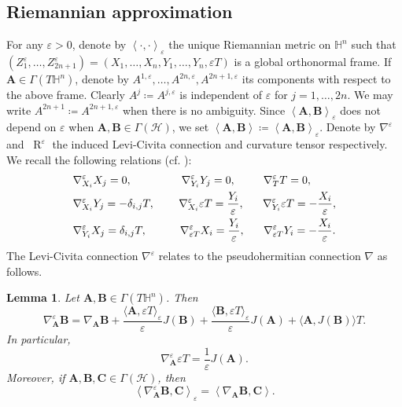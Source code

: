 \documentclass[11pt]{amsart}
\newcommand{\hhh}{{\mathcal{H}}}
\newcommand{\A}{\mathbf{A}}
\newcommand{\B}{\mathbf{B}}
\newcommand{\C}{\mathbf{C}}
\newcommand{\hh}{{\mathbb{H}}}
\newcommand{\eps}{\varepsilon}
\DeclareMathOperator{\R}{R}
\newtheorem{lemma}[theorem]{Lemma}
\theoremstyle{definition}
\theoremstyle{remark}
\numberwithin{equation}{section}
\begin{document}
   \subsection{Riemannian approximation}
   For any $\eps>0$, denote by $\left\langle\cdot,\cdot\right\rangle_\eps$ the unique Riemannian metric on $\hh^n$ such that $(Z_1^\eps,\ldots,Z_{2n+1}^\eps)=(X_1,\ldots,X_n,Y_1,\ldots,Y_n,\eps T)$ is a global orthonormal frame. If $\A\in\Gamma(T\hh^n)$, denote by $A^{1,\eps},\ldots,A^{2n,\eps},A^{2n+1,\eps}$ its components with respect to the above frame. Clearly $A^j\coloneqq A^{j,\eps}$ is independent of $\eps$ for $j=1,\ldots,2n$. We may write $A^{2n+1}\coloneqq A^{2n+1,\eps}$ when there is no ambiguity.
   Since $\left\langle\A,\B\right\rangle_\eps$ does not depend on $\eps$ when $\A,\B\in\Gamma(\hhh)$, we set $\left\langle\A,\B\right\rangle\coloneqq \left\langle\A,\B\right\rangle_\eps.$    Denote by $\nabla^\eps$ and $\ \R^\eps $ the induced Levi-Civita connection and curvature tensor respectively. We recall the following relations (cf. \cite{MR5029815}):
   \begin{alignat}{2}
&\notag \nabla_{X_i}^\eps X_j=0, \qquad \qquad  \ \, \nabla^\eps_{Y_i}Y_j=0, \qquad \ \,\nabla^\eps_{T}T=0, \\
\label{levi_civita}&\nabla^\eps_{X_i}Y_j=-\delta_{i,j}T, \qquad \, \nabla^\eps_{X_i}\eps T=\frac{Y_i}{\eps}, \quad \ \ \nabla^\eps_{Y_i}\eps T=-\frac{X_i}{\eps}, \\
&\notag \nabla^\eps_{Y_i}X_j=\delta_{i,j}T, \qquad \ \ \,\,\nabla^\eps_{\eps T}X_i=\frac{Y_i}{\eps}, \  \ \quad \nabla^\eps_{\eps T}Y_i=-\frac{X_i}{\eps}.
\end{alignat}
The Levi-Civita connection $\nabla^\eps$ relates to the pseudohermitian connection $\nabla$ as follows.
\begin{lemma}
    Let $\A,\B\in\Gamma(T\hh^n)$. Then
    \begin{equation}\label{levicivitavspseudohermitian}
        \nabla^\eps_\A\B=\nabla_\A\B+\frac{\langle\A,\eps T\rangle_\eps}{\eps}J(\B)+\frac{\langle\B,\eps T\rangle_\eps}{\eps}J(\A)+\langle \A,J(\B)\rangle T.
    \end{equation}
    In particular,
    \begin{equation}\label{connessioneerotazione}
    \nabla^\eps_\A \eps T=\frac{1}{\eps}J(\A).
\end{equation}
Moreover, if $\A,\B,\C\in\Gamma(\hhh)$, then
\begin{equation}\label{relazionetraleconnessioni}
    \left\langle\nabla^\eps_\A\B,\C\right\rangle_\eps=\left\langle\nabla_\A\B,\C\right\rangle.
\end{equation}
\end{lemma}
\end{document}
